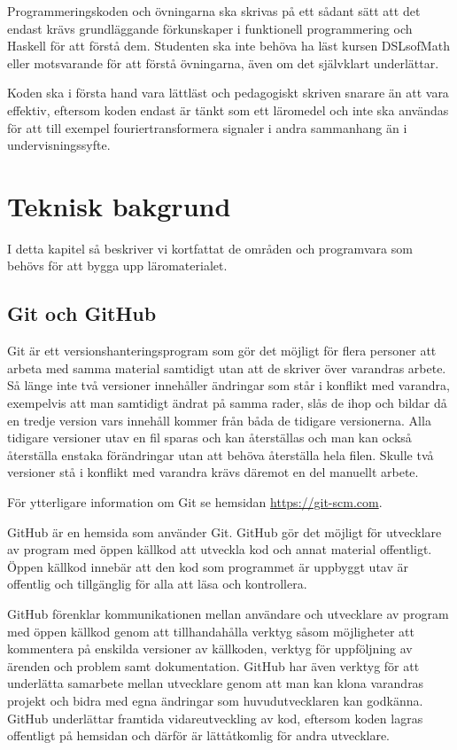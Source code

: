 \documentclass[12pt,a4paper,twoside,openright]{article}
\begin{document}
Programmeringskoden och övningarna ska skrivas på ett sådant sätt att
det endast krävs grundläggande förkunskaper i funktionell
programmering och Haskell för att förstå dem. Studenten ska inte
behöva ha läst kursen DSLsofMath eller motsvarande för att förstå
övningarna, även om det självklart underlättar.

Koden ska i första hand vara lättläst och pedagogiskt skriven snarare
än att vara effektiv, eftersom koden endast är tänkt som ett läromedel
och inte ska användas för att till exempel fouriertransformera
signaler i andra sammanhang än i undervisningssyfte.

\section{Teknisk bakgrund}
I detta kapitel så beskriver vi kortfattat de områden och programvara som
behövs för att bygga upp läromaterialet.

\subsection{Git och GitHub}
Git är ett versionshanteringsprogram som gör det möjligt för flera
personer att arbeta med samma material samtidigt utan att de skriver
över varandras arbete. Så länge inte två versioner innehåller
ändringar som står i konflikt med varandra, exempelvis att man
samtidigt ändrat på samma rader, slås de ihop och bildar då en tredje
version vars innehåll kommer från båda de tidigare versionerna. Alla
tidigare versioner utav en fil sparas och kan återställas och man kan
också återställa enstaka förändringar utan att behöva återställa hela
filen. Skulle två versioner stå i konflikt med varandra krävs däremot
en del manuellt arbete.

För ytterligare information om Git se hemsidan \url{https://git-scm.com}.

GitHub är en hemsida som använder Git. GitHub gör det möjligt för
utvecklare av program med öppen källkod att utveckla kod och annat
material offentligt. Öppen källkod innebär att den kod som programmet
är uppbyggt utav är offentlig och tillgänglig för alla att läsa och
kontrollera.

GitHub förenklar kommunikationen mellan användare och utvecklare av program med
öppen källkod genom att tillhandahålla verktyg såsom möjligheter att kommentera
på enskilda versioner av källkoden, verktyg för uppföljning av ärenden
och problem samt dokumentation. GitHub har även verktyg för att
underlätta samarbete mellan utvecklare genom att man kan klona
varandras projekt och bidra med egna ändringar som huvudutvecklaren
kan godkänna. GitHub underlättar framtida vidareutveckling av kod,
eftersom koden lagras offentligt på hemsidan och därför är
lättåtkomlig för andra utvecklare.
\end{document}
